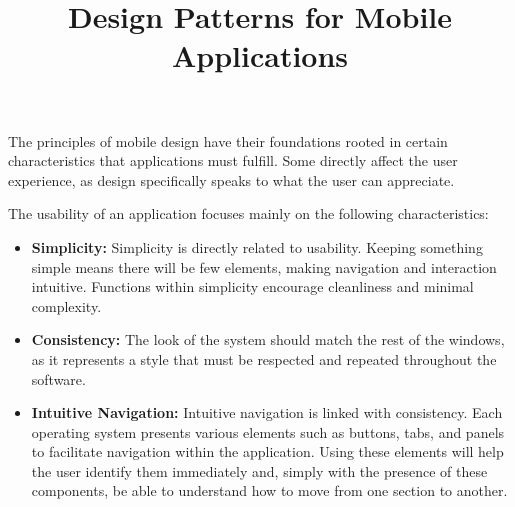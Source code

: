 \documentclass{article}
\title{Design Patterns for Mobile Applications}
\author{}
\date{}
\begin{document}
\maketitle

The principles of mobile design have their foundations rooted in certain characteristics that applications must fulfill. Some directly affect the user experience, as design specifically speaks to what the user can appreciate.

The usability of an application focuses mainly on the following characteristics:

\begin{itemize}
    \item \textbf{Simplicity:} Simplicity is directly related to usability. Keeping something simple means there will be few elements, making navigation and interaction intuitive. Functions within simplicity encourage cleanliness and minimal complexity.
    
    \item \textbf{Consistency:} The look of the system should match the rest of the windows, as it represents a style that must be respected and repeated throughout the software.
    
    \item \textbf{Intuitive Navigation:} Intuitive navigation is linked with consistency. Each operating system presents various elements such as buttons, tabs, and panels to facilitate navigation within the application. Using these elements will help the user identify them immediately and, simply with the presence of these components, be able to understand how to move from one section to another.
\end{itemize}
\end{document}
